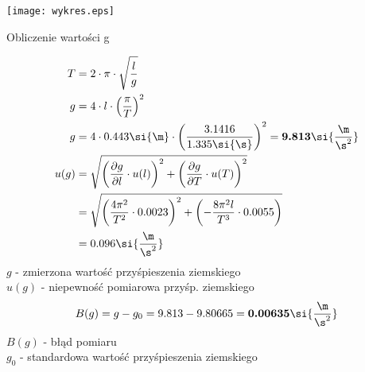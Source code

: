 \documentclass[12pt]{article}
\newenvironment{Figure}
  {\par\medskip\noindent\minipage{\linewidth}}
  {\endminipage\par\medskip}
\begin{document}
\begin{multicols}{2}
\columnbreak

\begin{Figure}
\centering
\texttt{[image: wykres.eps]}
\end{Figure}

Obliczenie wartości g

\begin{align}
T &= 2 \cdot \pi \cdot \sqrt{\frac{l}{g}} \\
g &= 4 \cdot l \cdot \left( \frac{\pi}{T} \right)^2 \\
g &= 4 \cdot 0.443\si{\m} \cdot \left(\frac{3.1416}{1.335\si{\s}}\right)^2 = \textbf{9.813} \si{\frac{\m}{\s^2}} \\
u(g) &= \sqrt{\left(\frac{\partial g}{\partial l} \cdot u(l)\right)^2 + \left(\frac{\partial g}{\partial T} \cdot u(T)\right)^2} \\
&= \sqrt{\left(\frac{4\pi^2}{T^2}\cdot0.0023\right)^2+\left(-\frac{8 \pi ^2 l}{T^3}\cdot0.0055\right)} \\&= 0.096 \si{\frac{\m}{\s^2}}
\end{align}
$g$ - zmierzona wartość przyśpieszenia ziemskiego \\
$u(g)$ - niepewność pomiarowa przyśp. ziemskiego
\begin{equation}
B(g) = g - g_0 = 9.813 - 9.80665 = \textbf{0.00635}\si{\frac{\m}{\s^2}}
\end{equation}
$B(g)$ - błąd pomiaru \\
$g_0$ - standardowa wartość przyśpieszenia ziemskiego
\end{multicols}
\newpage
\end{document}
